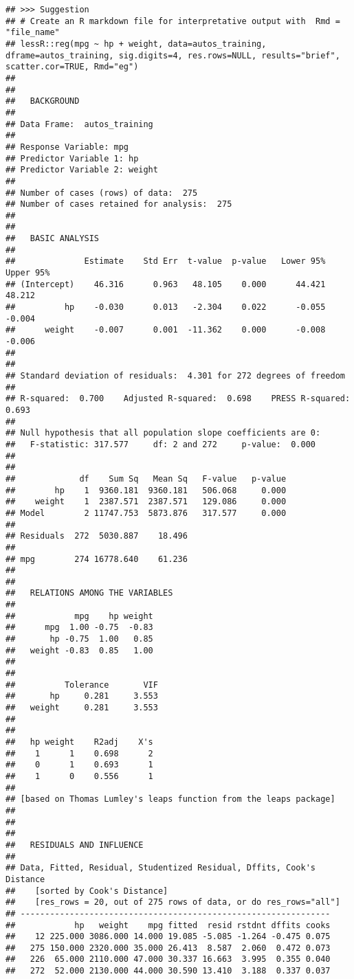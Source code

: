 \documentclass[]{article}
\begin{document}
\begin{verbatim}
## >>> Suggestion
## # Create an R markdown file for interpretative output with  Rmd = "file_name"
## lessR::reg(mpg ~ hp + weight, data=autos_training, dframe=autos_training, sig.digits=4, res.rows=NULL, results="brief", scatter.cor=TRUE, Rmd="eg")  
## 
## 
##   BACKGROUND
## 
## Data Frame:  autos_training 
##  
## Response Variable: mpg 
## Predictor Variable 1: hp 
## Predictor Variable 2: weight 
##  
## Number of cases (rows) of data:  275 
## Number of cases retained for analysis:  275 
## 
## 
##   BASIC ANALYSIS
## 
##              Estimate    Std Err  t-value  p-value   Lower 95%   Upper 95% 
## (Intercept)    46.316      0.963   48.105    0.000      44.421      48.212 
##          hp    -0.030      0.013   -2.304    0.022      -0.055      -0.004 
##      weight    -0.007      0.001  -11.362    0.000      -0.008      -0.006 
## 
## 
## Standard deviation of residuals:  4.301 for 272 degrees of freedom 
##  
## R-squared:  0.700    Adjusted R-squared:  0.698    PRESS R-squared:  0.693 
## 
## Null hypothesis that all population slope coefficients are 0:
##   F-statistic: 317.577     df: 2 and 272     p-value:  0.000 
## 
## 
##             df    Sum Sq   Mean Sq   F-value   p-value 
##        hp    1  9360.181  9360.181   506.068     0.000 
##    weight    1  2387.571  2387.571   129.086     0.000 
## Model        2 11747.753  5873.876   317.577     0.000 
##  
## Residuals  272  5030.887    18.496 
##  
## mpg        274 16778.640    61.236 
## 
## 
##   RELATIONS AMONG THE VARIABLES
## 
##            mpg    hp weight 
##      mpg  1.00 -0.75  -0.83 
##       hp -0.75  1.00   0.85 
##   weight -0.83  0.85   1.00 
## 
## 
##          Tolerance       VIF 
##       hp     0.281     3.553 
##   weight     0.281     3.553 
## 
## 
##   hp weight    R2adj    X's 
##    1      1    0.698      2 
##    0      1    0.693      1 
##    1      0    0.556      1 
##  
## [based on Thomas Lumley's leaps function from the leaps package] 
##  
## 
## 
##   RESIDUALS AND INFLUENCE
## 
## Data, Fitted, Residual, Studentized Residual, Dffits, Cook's Distance 
##    [sorted by Cook's Distance] 
##    [res_rows = 20, out of 275 rows of data, or do res_rows="all"] 
## --------------------------------------------------------------- 
##            hp   weight    mpg fitted  resid rstdnt dffits cooks 
##    12 225.000 3086.000 14.000 19.085 -5.085 -1.264 -0.475 0.075 
##   275 150.000 2320.000 35.000 26.413  8.587  2.060  0.472 0.073 
##   226  65.000 2110.000 47.000 30.337 16.663  3.995  0.355 0.040 
##   272  52.000 2130.000 44.000 30.590 13.410  3.188  0.337 0.037 

\end{verbatim}
\end{document}
